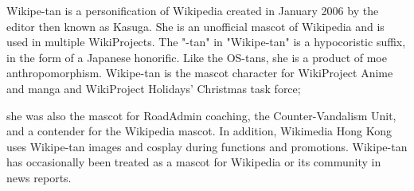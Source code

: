 Wikipe-tan  is a personification of Wikipedia created in January 2006 by the editor then known as Kasuga.
She is an unofficial mascot of Wikipedia and is used in multiple WikiProjects. The "-tan" in "Wikipe-tan" 
is a hypocoristic suffix, in the form of a Japanese honorific. Like the OS-tans, she is a product of moe anthropomorphism.
Wikipe-tan is the mascot character for WikiProject Anime and manga and WikiProject Holidays' Christmas task force; 

she was also the mascot for RoadAdmin coaching, the Counter-Vandalism Unit, and a contender for the Wikipedia mascot. 
In addition, Wikimedia Hong Kong uses Wikipe-tan images and cosplay during functions and promotions. Wikipe-tan 
has occasionally been treated as a mascot for Wikipedia or its community in news reports.


